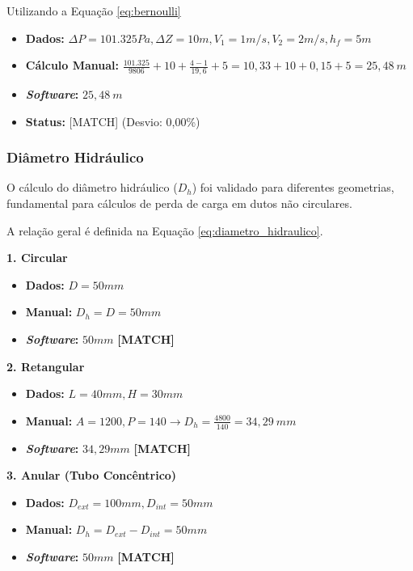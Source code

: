 \begin{center} Utilizando a Equação \ref{eq:bernoulli} \end{center}

\begin{itemize}
    \item \textbf{Dados:} $\Delta P=101.325 Pa, \Delta Z=10m, V_1=1m/s, V_2=2m/s, h_f=5m$
    \item \textbf{Cálculo Manual:} $\frac{101.325}{9806} + 10 + \frac{4-1}{19,6} + 5 = 10,33 + 10 + 0,15 + 5 = 25,48 \ m$
    \item \textbf{\textit{Software}:} $25,48 \ m$
    \item \textbf{Status:} [MATCH] (Desvio: 0,00\%)
\end{itemize}

\subsubsection{Diâmetro Hidráulico}
O cálculo do diâmetro hidráulico ($D_h$) foi validado para diferentes geometrias, fundamental para cálculos de perda de carga em dutos não circulares.

A relação geral é definida na Equação \ref{eq:diametro_hidraulico}.

\textbf{1. Circular}
\begin{itemize}
    \item \textbf{Dados:} $D=50mm$
    \item \textbf{Manual:} $D_h = D = 50mm$
    \item \textbf{\textit{Software}:} $50mm$ \textbf{[MATCH]}
\end{itemize}

\textbf{2. Retangular}
\begin{itemize}
    \item \textbf{Dados:} $L=40mm, H=30mm$
    \item \textbf{Manual:} $A=1200, P=140 \rightarrow D_h = \frac{4800}{140} = 34,29 \ mm$
    \item \textbf{\textit{Software}:} $34,29mm$ \textbf{[MATCH]}
\end{itemize}

\textbf{3. Anular (Tubo Concêntrico)}
\begin{itemize}
    \item \textbf{Dados:} $D_{ext}=100mm, D_{int}=50mm$
    \item \textbf{Manual:} $D_h = D_{ext} - D_{int} = 50mm$
    \item \textbf{\textit{Software}:} $50mm$ \textbf{[MATCH]}
\end{itemize}

